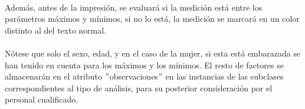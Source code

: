 \documentclass[a4paper,10pt]{article}
\begin{document}
\paragraph{}
Además, antes de la impresión, se evaluará si la medición está entre los parámetros máximos y mínimos, si no lo está, la medición se marcará en un color distinto al del texto normal.
\paragraph{}
Nótese que solo el sexo, edad, y en el caso de la mujer, si esta está embarazada se han tenido en cuenta para los máximos y los mínimos. El resto de factores se almacenarán en el atributo $"$observaciones$"$ en las instancias de las subclases correspondientes al tipo de análisis, para su posterior consideración por el personal cualificado.
\pagebreak
\end{document}
